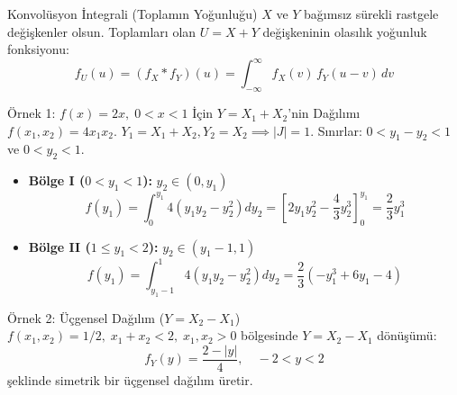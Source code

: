 \documentclass[12pt,a4paper]{article}
\begin{document}
\begin{tanim}{Konvolüsyon İntegrali (Toplamın Yoğunluğu)}
$X$ ve $Y$ bağımsız sürekli rastgele değişkenler olsun. Toplamları olan $U = X + Y$ değişkeninin olasılık yoğunluk fonksiyonu:
\begin{equation}
    f_U(u) = (f_X * f_Y)(u) = \int_{-\infty}^{\infty} f_X(v) \, f_Y(u - v) \, dv
\end{equation}
\end{tanim}

\begin{ornek}{Örnek 1: $f(x) = 2x, \; 0 < x < 1$ İçin $Y = X_1 + X_2$'nin Dağılımı}
$f(x_1, x_2) = 4x_1 x_2$. $Y_1 = X_1 + X_2, Y_2 = X_2 \implies |J| = 1$.  
Sınırlar: $0 < y_1 - y_2 < 1$ ve $0 < y_2 < 1$.
\begin{itemize}
    \item \textbf{Bölge I ($0 < y_1 < 1$):} $y_2 \in (0, y_1)$
    \begin{equation}
        f(y_1) = \int_{0}^{y_1} 4(y_1 y_2 - y_2^2) dy_2 = \left[ 2y_1 y_2^2 - \frac{4}{3}y_2^3 \right]_0^{y_1} = \boxed{\frac{2}{3}y_1^3}
    \end{equation}
    \item \textbf{Bölge II ($1 \le y_1 < 2$):} $y_2 \in (y_1 - 1, 1)$
    \begin{equation}
        f(y_1) = \int_{y_1 - 1}^{1} 4(y_1 y_2 - y_2^2) dy_2 = \boxed{\frac{2}{3}\left( -y_1^3 + 6y_1 - 4 \right)}
    \end{equation}
\end{itemize}
\end{ornek}

\begin{ornek}{Örnek 2: Üçgensel Dağılım ($Y = X_2 - X_1$)}
$f(x_1, x_2) = 1/2, \; x_1 + x_2 < 2, \; x_1, x_2 > 0$ bölgesinde $Y = X_2 - X_1$ dönüşümü:
\begin{equation}
    f_Y(y) = \frac{2 - |y|}{4}, \quad -2 < y < 2
\end{equation}
şeklinde simetrik bir üçgensel dağılım üretir.
\end{ornek}

\begin{center}
\end{center}
\end{document}
